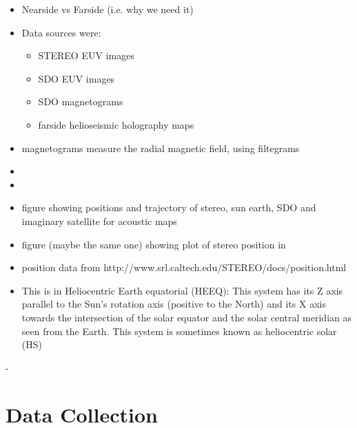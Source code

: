 \documentclass[11pt,a4paper,onecolumn]{report}
\begin{document}
\begin{itemize}
  \item Nearside vs Farside (i.e. why we need it)
  \item Data sources were:
        \begin{itemize}
          \item STEREO EUV images
          \item SDO EUV images
          \item SDO magnetograms
          \item farside helioseismic holography maps
        \end{itemize}
  \item magnetograms measure the radial magnetic field, using filtegrams
  \item %
  \item %
  \item figure showing positions and trajectory of stereo, sun earth, SDO and
        imaginary satellite for acoustic maps
  \item figure (maybe the same one) showing plot of stereo position in
  \item position data from http://www.srl.caltech.edu/STEREO/docs/position.html
  \item This is in Heliocentric Earth equatorial (HEEQ): This system has its Z
        axis parallel to the Sun's rotation axis (positive to the North) and its X
        axis towards the intersection of the solar equator and the solar central
        meridian as seen from the Earth. This system is sometimes known as
        heliocentric solar (HS)
\end{itemize}

-

\section{Data Collection}
\end{document}
